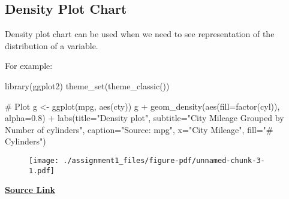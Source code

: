 \documentclass[
  letterpaper,
  DIV=11,
  numbers=noendperiod]{scrreprt}
\newenvironment{Shaded}{\begin{snugshade}}{\end{snugshade}}
\newcommand{\AttributeTok}[1]{\textcolor[rgb]{0.40,0.45,0.13}{#1}}
\newcommand{\CommentTok}[1]{\textcolor[rgb]{0.37,0.37,0.37}{#1}}
\newcommand{\FloatTok}[1]{\textcolor[rgb]{0.68,0.00,0.00}{#1}}
\newcommand{\FunctionTok}[1]{\textcolor[rgb]{0.28,0.35,0.67}{#1}}
\newcommand{\NormalTok}[1]{\textcolor[rgb]{0.00,0.23,0.31}{#1}}
\newcommand{\OtherTok}[1]{\textcolor[rgb]{0.00,0.23,0.31}{#1}}
\newcommand{\SpecialCharTok}[1]{\textcolor[rgb]{0.37,0.37,0.37}{#1}}
\newcommand{\StringTok}[1]{\textcolor[rgb]{0.13,0.47,0.30}{#1}}
\begin{document}
\hypertarget{density-plot-chart}{%
\subsection{Density Plot Chart}\label{density-plot-chart}}

Density plot chart can be used when we need to see representation of the
distribution of a variable.

For example:

\begin{Shaded}
\begin{Highlighting}[]
\FunctionTok{library}\NormalTok{(ggplot2)}
\FunctionTok{theme\_set}\NormalTok{(}\FunctionTok{theme\_classic}\NormalTok{())}

\CommentTok{\# Plot}
\NormalTok{g }\OtherTok{\textless{}{-}} \FunctionTok{ggplot}\NormalTok{(mpg, }\FunctionTok{aes}\NormalTok{(cty))}
\NormalTok{g }\SpecialCharTok{+} \FunctionTok{geom\_density}\NormalTok{(}\FunctionTok{aes}\NormalTok{(}\AttributeTok{fill=}\FunctionTok{factor}\NormalTok{(cyl)), }\AttributeTok{alpha=}\FloatTok{0.8}\NormalTok{) }\SpecialCharTok{+} 
    \FunctionTok{labs}\NormalTok{(}\AttributeTok{title=}\StringTok{"Density plot"}\NormalTok{, }
         \AttributeTok{subtitle=}\StringTok{"City Mileage Grouped by Number of cylinders"}\NormalTok{,}
         \AttributeTok{caption=}\StringTok{"Source: mpg"}\NormalTok{,}
         \AttributeTok{x=}\StringTok{"City Mileage"}\NormalTok{,}
         \AttributeTok{fill=}\StringTok{"\# Cylinders"}\NormalTok{)}
\end{Highlighting}
\end{Shaded}

\begin{figure}[H]

{\centering \texttt{[image: ./assignment1\_files/figure-pdf/unnamed-chunk-3-1.pdf]}

}

\end{figure}

\href{https://www.geeksforgeeks.org/}{\textbf{Source Link}}
\end{document}
